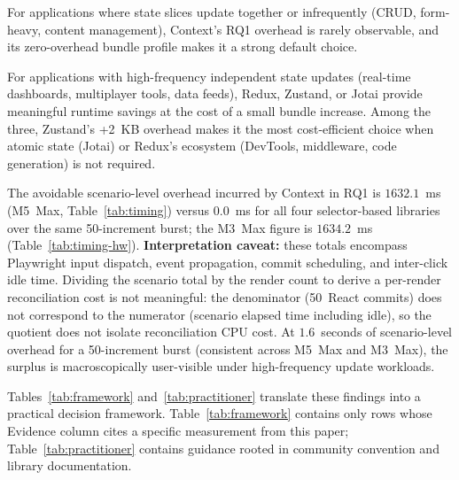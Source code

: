 \documentclass[conference]{IEEEtran}
\begin{document}
For applications where state slices update together or infrequently
(CRUD, form-heavy, content management), Context's RQ1 overhead is
rarely observable, and its zero-overhead bundle profile makes it a
strong default choice.

For applications with high-frequency independent state updates (real-time
dashboards, multiplayer tools, data feeds), Redux, Zustand, or Jotai
provide meaningful runtime savings at the cost of a small bundle
increase. Among the three, Zustand's +2~KB overhead makes it the most
cost-efficient choice when atomic state (Jotai) or Redux's ecosystem
(DevTools, middleware, code generation) is not required.

The avoidable scenario-level overhead incurred by Context in RQ1 is
$1632.1$~ms (M5~Max, Table~\ref{tab:timing}) versus $0.0$~ms for all
four selector-based libraries over the same 50-increment burst;
the M3~Max figure is $1634.2$~ms (Table~\ref{tab:timing-hw}).
\textbf{Interpretation caveat:} these totals encompass Playwright input
dispatch, event propagation, commit scheduling, and inter-click idle
time.  Dividing the scenario total by the render count to derive a
per-render reconciliation cost is not meaningful: the denominator
(50~React commits) does not correspond to the numerator (scenario
elapsed time including idle), so the quotient does not isolate
reconciliation CPU cost.  At $1.6$~seconds of scenario-level overhead
for a 50-increment burst (consistent across M5~Max and M3~Max), the
surplus is macroscopically user-visible under high-frequency update
workloads.

Tables~\ref{tab:framework} and~\ref{tab:practitioner} translate these
findings into a practical decision framework. Table~\ref{tab:framework} contains only
rows whose Evidence column cites a specific measurement from this paper;
Table~\ref{tab:practitioner} contains guidance rooted in community
convention and library documentation.
\end{document}
